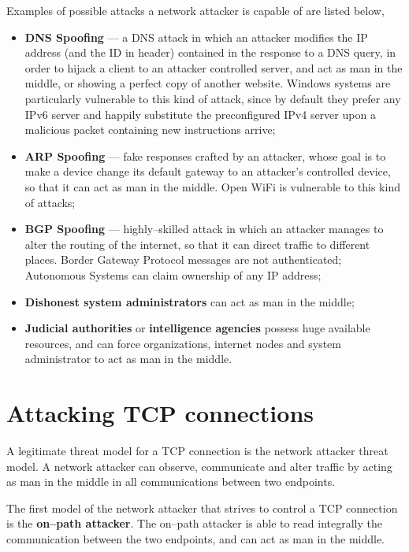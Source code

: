 \documentclass[10pt]{\classname}
\begin{document}
Examples of possible attacks a network attacker is capable of are listed below,
\begin{itemize}
    \item \textbf{DNS Spoofing} --- a DNS attack in which an attacker modifies
        the IP address (and the ID in header) contained in the response to a
        DNS query, in order to hijack a client to an attacker controlled
        server, and act as man in the middle, or showing a perfect copy of
        another website. Windows systems are particularly vulnerable to this
        kind of attack, since by default they prefer any IPv6 server and
        happily substitute the preconfigured IPv4 server upon a malicious
        packet containing new instructions arrive;
    \item \textbf{ARP Spoofing} --- fake responses crafted by an attacker, whose
        goal is to make a device change its default gateway to an attacker's
        controlled device, so that it can act as man in the middle. Open WiFi
        is vulnerable to this kind of attacks;
    \item \textbf{BGP Spoofing} --- highly--skilled attack in which an attacker
        manages to alter the routing of the internet, so that it can direct
        traffic to different places. Border Gateway Protocol messages are not
        authenticated; Autonomous Systems can claim ownership of any IP
        address;
    \item \textbf{Dishonest system administrators} can act as man in the middle;
    \item \textbf{Judicial authorities} or \textbf{intelligence agencies}
        possess huge available resources, and can force organizations, internet
        nodes and system administrator to act as man in the middle.
\end{itemize}


\section{Attacking TCP connections}

A legitimate threat model for a TCP connection is the network attacker threat
model. A network attacker can observe, communicate and alter traffic by acting
as man in the middle in all communications between two endpoints.

The first model of the network attacker that strives to control a TCP connection
is the \textbf{on--path attacker}. The on--path attacker is able to read
integrally the communication between the two endpoints, and can act as man in
the middle.
\end{document}
